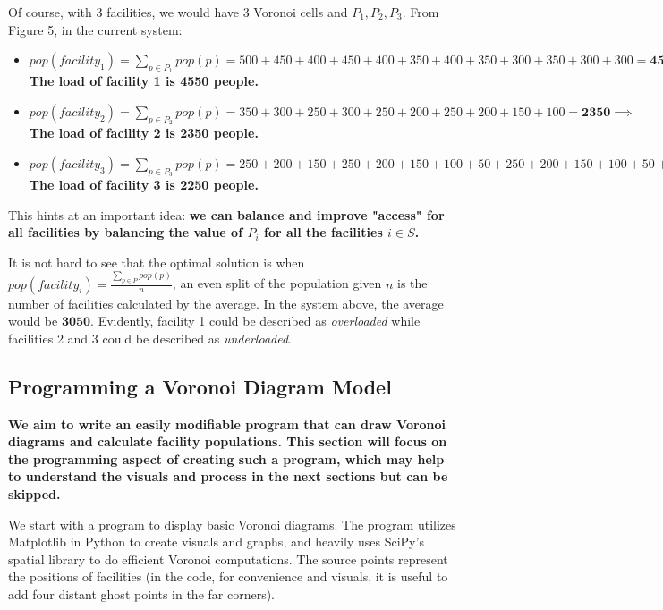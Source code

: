 \documentclass{article}
\begin{document}
Of course, with 3 facilities, we would have 3 Voronoi cells and $P_1, P_2, P_3$. From Figure 5, in the current system: 

\begin{itemize}

\item $pop(facility_1) = \sum\limits_{p \in P_1} pop(p) = 500 + 450 + 400 + 450 + 400 + 350 + 400 + 350 + 300 + 350 + 300 + 300 = \mathbf{4550} \implies $ \textbf{The load of facility 1 is 4550 people.}

\item $pop(facility_2) = \sum\limits_{p \in P_2} pop(p) = 350 + 300 + 250 + 300 + 250 + 200 + 250 + 200 + 150 + 100 = \mathbf{2350} \implies $ \textbf{The load of facility 2 is 2350 people.}

\item $pop(facility_3) = \sum\limits_{p \in P_3} pop(p) = 250 + 200 + 150 + 250 + 200 + 150 + 100 + 50 + 250 + 200 + 150 + 100 + 50 + 150 = \mathbf{2250} \implies $ \textbf{The load of facility 3 is 2250 people.}

\end{itemize}

This hints at an important idea:  \textbf{we can balance and improve "access" for all facilities by balancing the value of $P_i$ for all the facilities $i \in S$.}

It is not hard to see that the optimal solution is when $pop(facility_i) = \frac{\sum_{p\in P}{pop(p)}}{n}$, an even split of the population given $n$ is the number of facilities calculated by the average. In the system above, the average would be $\mathbf{3050}$. Evidently, facility 1 could be described as \textit{overloaded} while facilities 2 and 3 could be described as \textit{underloaded}.

\subsection{Programming a Voronoi Diagram Model}

\textbf{We aim to write an easily modifiable program that can draw Voronoi diagrams and calculate facility populations. This section will focus on the programming aspect of creating such a program, which may help to understand the visuals and process in the next sections but can be skipped.} 

We start with a program to display basic Voronoi diagrams. The program utilizes Matplotlib in Python to create visuals and graphs, and heavily uses SciPy's spatial library to do efficient Voronoi computations. The source points represent the positions of facilities (in the code, for convenience and visuals, it is useful to add four distant ghost points in the far corners).
\end{document}
